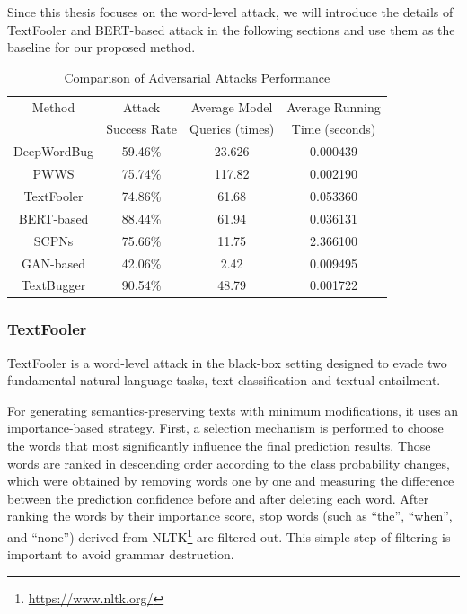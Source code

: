 Since this thesis focuses on the word-level attack, we will introduce the details of TextFooler and BERT-based attack in the following sections and use them as the baseline for our proposed method.

\begin{table}[h]
  \footnotesize
  \centering
  \begin{tabular}{|c||c|c|c|}
    \hline
    Method & Attack  & Average Model  & Average Running \\
           & Success Rate & Queries (times) & Time (seconds) \\
    \hline \hline
    DeepWordBug & 59.46\% & 23.626 & 0.000439 \\
   
    PWWS & 75.74\% & 117.82 & 0.002190 \\
   
    TextFooler & 74.86\% & 61.68 & 0.053360 \\
   
    BERT-based & 88.44\% & 61.94 & 0.036131 \\
   
    SCPNs & 75.66\% & 11.75 & 2.366100 \\
   
    GAN-based & 42.06\% & 2.42 & 0.009495 \\
   
    TextBugger & 90.54\% & 48.79 & 0.001722 \\
    \hline
  \end{tabular}
  \caption{Comparison of Adversarial Attacks Performance \cite{QIU2022278}}
\label{tab:2_2_attack-performance}
\end{table}


\subsubsection{TextFooler}\label{subsubsec:textfooler}

TextFooler \cite{journals/corr/abs-1907-11932} is  a word-level attack in the black-box setting designed to evade two fundamental natural language tasks, text classification and textual entailment. 

For generating semantics-preserving texts with minimum modifications, it uses an importance-based strategy. First, a selection mechanism is performed to choose the words that most significantly influence the final prediction results. Those words are ranked in descending order according to the class probability changes, which were obtained by removing words one by one and measuring the difference between the prediction confidence before and after deleting each word.
After ranking the words by their importance score, stop words (such as “the”, “when”, and “none”) derived from NLTK\footnote{\url{https://www.nltk.org/}} are filtered out. This simple step of filtering is important to avoid grammar destruction.

